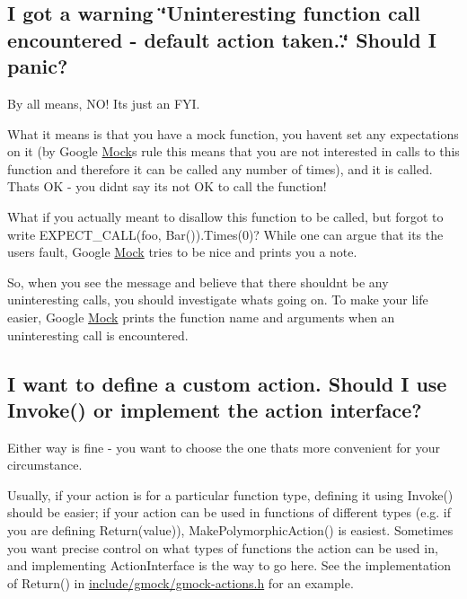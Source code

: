 \subsection*{I got a warning \char`\"{}\+Uninteresting function call encountered -\/ default action taken..\char`\"{} Should I panic?}

By all means, N\+O! It\textquotesingle{}s just an F\+YI.

What it means is that you have a mock function, you haven\textquotesingle{}t set any expectations on it (by Google \hyperlink{classMock}{Mock}\textquotesingle{}s rule this means that you are not interested in calls to this function and therefore it can be called any number of times), and it is called. That\textquotesingle{}s OK -\/ you didn\textquotesingle{}t say it\textquotesingle{}s not OK to call the function!

What if you actually meant to disallow this function to be called, but forgot to write {\ttfamily E\+X\+P\+E\+C\+T\+\_\+\+C\+A\+L\+L(foo, Bar()).Times(0)}? While one can argue that it\textquotesingle{}s the user\textquotesingle{}s fault, Google \hyperlink{classMock}{Mock} tries to be nice and prints you a note.

So, when you see the message and believe that there shouldn\textquotesingle{}t be any uninteresting calls, you should investigate what\textquotesingle{}s going on. To make your life easier, Google \hyperlink{classMock}{Mock} prints the function name and arguments when an uninteresting call is encountered.

\subsection*{I want to define a custom action. Should I use Invoke() or implement the action interface?}

Either way is fine -\/ you want to choose the one that\textquotesingle{}s more convenient for your circumstance.

Usually, if your action is for a particular function type, defining it using {\ttfamily Invoke()} should be easier; if your action can be used in functions of different types (e.\+g. if you are defining {\ttfamily Return(value)}), {\ttfamily Make\+Polymorphic\+Action()} is easiest. Sometimes you want precise control on what types of functions the action can be used in, and implementing {\ttfamily Action\+Interface} is the way to go here. See the implementation of {\ttfamily Return()} in {\ttfamily \hyperlink{gmock-actions_8h_source}{include/gmock/gmock-\/actions.\+h}} for an example.

